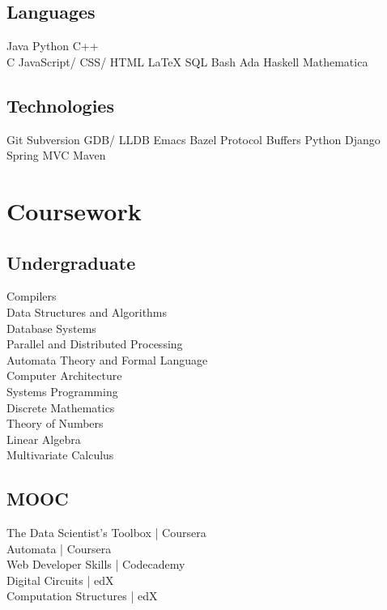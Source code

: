 \documentclass[letterpaper]{deedy-resume} %
\begin{document}
\begin{minipage}[t]{0.33\textwidth}
\subsection{Languages}

Java \textbullet{} Python \textbullet{} C++\\ 
C \textbullet{} JavaScript/ CSS/ HTML \textbullet{} \LaTeX \textbullet{} SQL Bash \textbullet{} Ada \textbullet{} Haskell \textbullet{} Mathematica
\sectionspace

\subsection{Technologies}
Git \textbullet{} Subversion \textbullet{} GDB/ LLDB \textbullet{} Emacs Bazel \textbullet{} Protocol Buffers \textbullet{} Python Django Spring MVC \textbullet{} Maven 
\sectionspace %


\section{Coursework}

\subsection{Undergraduate}

Compilers \\
Data Structures and Algorithms \\
Database Systems \\
Parallel and Distributed Processing \\
Automata Theory and Formal Language \\
Computer Architecture \\
Systems Programming \\
Discrete Mathematics \\
Theory of Numbers \\
Linear Algebra \\
Multivariate Calculus

\sectionspace %

\subsection{MOOC}

The Data Scientist's Toolbox | Coursera \\
Automata | Coursera \\
Web Developer Skills | Codecademy \\
Digital Circuits | edX \\
Computation Structures | edX

\sectionspace


\end{minipage} %
\end{document}
